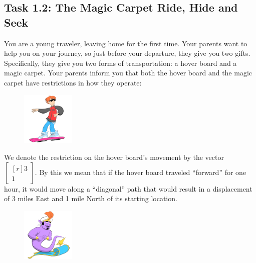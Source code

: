 \documentclass{problemset}
\newcommand{\mat}[1]{\begin{bmatrix*}[r]#1\end{bmatrix*}}
\begin{document}
\begin{iola}
\section*{Task 1.2: The Magic Carpet Ride, Hide and Seek}


You are a young traveler, leaving home for the first time. Your parents
want to help you on your journey, so just before your departure, they give
you two gifts. Specifically, they give you two forms of transportation:
a hover board and a magic carpet. Your parents inform you that both the
hover board and the magic carpet have restrictions in how they operate:



\begin{minipage}{\textwidth}
	\vspace{.5cm}
	\begin{figure}
	\vspace{-.8cm}
	\includegraphics[width=1in]{images/HoverBoard-small.png}
	\end{figure}

	We denote the restriction on the hover board's movement by the vector
	$\mat{3 \\1}$. By this we mean that if
	the hover board traveled ``forward'' for one hour, it would move along a
	``diagonal'' path that would result in a displacement of 3 miles East and
	1 mile North of its starting location.
\end{minipage}

\begin{minipage}{\textwidth}
	\vspace{.5cm}
	\begin{figure}
	\vspace{-.8cm}
	\includegraphics[width=1in]{images/MagicCarpet-small.png}
	\end{figure}


\end{minipage}
\end{iola}
\end{document}
